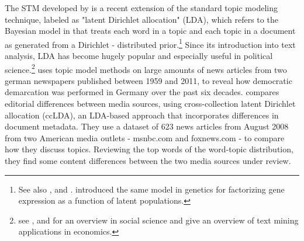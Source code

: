 \documentclass[12pt,a4paper,notitlepage]{article}
\begin{document}
The STM developed by \citet{roberts_model_2016} is a recent extension of the standard topic modeling technique, labeled as "latent Dirichlet allocation" (LDA), which refers to the Bayesian model in \citet{blei_latent_2003} that treats each word in a topic and each topic in a document as generated from a Dirichlet - distributed prior.\footnote{See also \citet{griffiths_probabilistic_2002}, \citet{griffiths_finding_2004} and \citet{hofmann_probabilistic_1999}. \citet{pritchard_inference_2000} introduced the same model in genetics for factorizing gene expression as a function of latent populations.} Since its introduction into text analysis, LDA has become hugely popular and especially useful in political science.\footnote{see \citet{blei_probabilistic_2012}, \citet{grimmer_text_2013} and \citet{wiedmann_text_2016} for an overview in social science and \citet{gentzkow_text_2017} give an overview of text mining applications in economics.} \citet{wiedmann_text_2016} uses topic model methods on large amounts of news articles from two german newspapers published between 1959 and 2011, to reveal how democratic demarcation was performed in Germany over the past six decades. \citet{paul_cross-collection_2017} compares editorial differences between media sources, using cross-collection latent Dirichlet allocation (ccLDA), an LDA-based approach that incorporates differences in document metadata. They use a dataset of 623 news articles from August 2008 from two American media outlets - msnbc.com and foxnews.com - to compare how they discuss topics. Reviewing the top words of the word-topic distribution, they find some content differences between the two media sources under review. 
\end{document}
